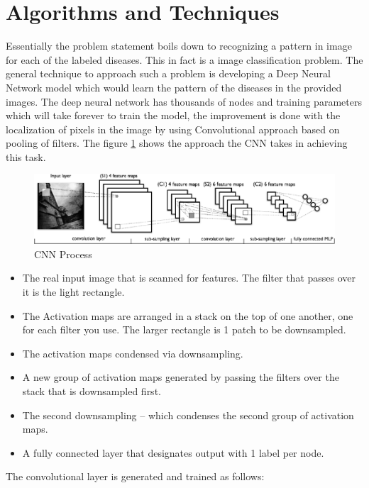\documentclass{article}
\begin{document}
    \section{Algorithms and Techniques}
    Essentially the problem statement boils down to recognizing a pattern in image for each of the labeled diseases. This in fact is a image classification problem. The general technique to approach such a problem is developing a Deep Neural Network model which would learn the pattern of the diseases in the provided images. The deep neural network has thousands of nodes and training parameters which will take forever to train the model, the improvement is done with the localization of pixels in the image by using Convolutional approach based on pooling of filters. The figure \ref{fig:cnn-process} shows the approach the CNN takes in achieving this task.
    \begin{figure}
        \includegraphics[width=\linewidth]{./images/convolutional-neural-net-process-3.png}
        \caption{CNN Process}
        \label{fig:cnn-process}
    \end{figure}
    \begin{itemize}
        \item The real input image that is scanned for features. The filter that passes over it is the light rectangle.
        \item The Activation maps are arranged in a stack on the top of one another, one for each filter you use. The larger rectangle is 1 patch to be downsampled.
        \item The activation maps condensed via downsampling.
        \item A new group of activation maps generated by passing the filters over the stack that is downsampled first.
        \item The second downsampling – which condenses the second group of activation maps.
        \item A fully connected layer that designates output with 1 label per node.
    \end{itemize}
    The convolutional layer is generated and trained as follows:
\end{document}
